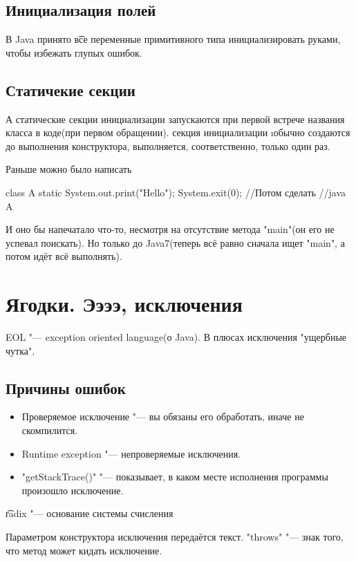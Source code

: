 \subsection{Инициализация полей}
В Java принято \t{все} переменные примитивного типа инициализировать руками, чтобы избежать глупых ошибок.

\subsection{Статичекие секции}
А статические секции инициализации запускаются при первой встрече названия класса в коде(при первом обращении).
секция инициализации \i{обычно} создаются до выполнения конструктора, выполняется, соответственно, только один раз.

Раньше можно было написать
\begin{javacode}
class A {
	static {
		System.out.print("Hello");
		System.exit(0);
	}
}
//Потом сделать
//java A
\end{javacode}


И оно бы напечатало что-то, несмотря на отсутствие метода \java"main"(он его не успевал поискать).
Но только до Java7(теперь всё равно сначала ищет \java"main", а потом идёт всё выполнять).

\section{Ягодки. Ээээ, исключения}
EOL "--- exception oriented language(о Java).
В плюсах исключения "ущербные чутка".

\subsection{Причины ошибок}
\begin{itemize}
	\item
		Проверяемое исключение "--- вы обязаны его обработать, иначе не скомпилится.
	\item
		Runtime exception "--- непроверяемые исключения.
	\item
		\java"getStackTrace()" "--- показывает, в каком месте исполнения программы произошло исключение.
\end{itemize}

\t{radix} "--- основание системы счисления

Параметром конструктора исключения передаётся текст.
\java"throws" "--- знак того, что метод может кидать исключение.



